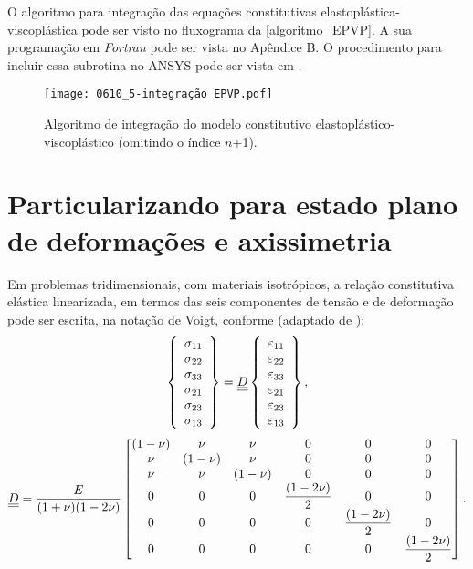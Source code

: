 O algoritmo para integração das equações constitutivas elastoplástica-viscoplástica pode ser visto no fluxograma da \autoref{algoritmo_EPVP}. A sua programação em \textit{Fortran} pode ser vista no Apêndice B. O procedimento para incluir essa subrotina no ANSYS pode ser vista em .
\begin{figure}[H]
	\begin{center}
		\texttt{[image: 0610\_5-integração EPVP.pdf]}
	\end{center}
	\caption{\label{algoritmo_EPVP}Algoritmo de integração do modelo constitutivo elastoplástico-viscoplástico (omitindo o índice $n$+1).}
\end{figure}

\section{Particularizando para estado plano de deformações e axissimetria}
Em problemas tridimensionais, com materiais isotrópicos, a relação constitutiva elástica linearizada, em termos das seis componentes de tensão e de deformação pode ser escrita, na notação de Voigt, conforme (adaptado de ):
\begin{equation}
	\label{eq:Dl}
	\left\{\begin{array}{lcl}
		\sigma_{11} \\
		\sigma_{22} \\
		\sigma_{33} \\
		\sigma_{21} \\
		\sigma_{23} \\
		\sigma_{13} 
	\end{array}\right\} = 
	\underline{\underline D}
	\left\{\begin{array}{lcl}
	\varepsilon_{11} \\
	\varepsilon_{22} \\
	\varepsilon_{33} \\
	\varepsilon_{21} \\
	\varepsilon_{23} \\
	\varepsilon_{13} 
\end{array}\right\},
\end{equation}
\begin{equation}
	\underline{\underline D} = 
	\dfrac{E}{(1+\nu)(1-2\nu)} 
	\begin{bmatrix}
	(1-\nu)	& \nu 		& \nu  		& 0	 		& 0 			& 0 \\
	\nu 	& (1-\nu)	& \nu  		& 0		 	& 0				& 0  \\
	\nu 	& \nu 		& (1-\nu)   & 0		 	& 0 			& 0  \\
	0		& 0			& 0		    & \dfrac{(1-2\nu)}{2} & 0 			& 0  \\
	0		& 0			& 0		    & 0	       	& \dfrac{(1-2\nu)}{2}	& 0  \\
	0		& 0			& 0		    & 0	       	& 0         	& \dfrac{(1-2\nu)}{2}
	\end{bmatrix}.
\end{equation}

